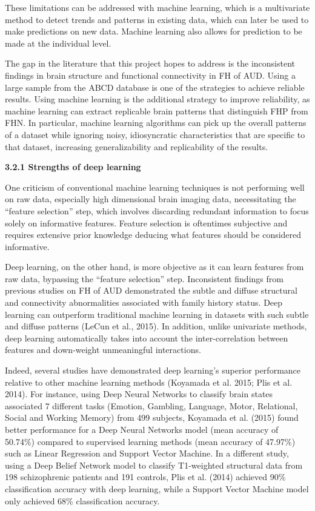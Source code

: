 \documentclass[]{article}
\begin{document}
These limitations can be addressed with machine learning, which is a
multivariate method to detect trends and patterns in existing data,
which can later be used to make predictions on new data. Machine
learning also allows for prediction to be made at the individual level.

The gap in the literature that this project hopes to address is the
inconsistent findings in brain structure and functional connectivity in
FH of AUD. Using a large sample from the ABCD database is one of the
strategies to achieve reliable results. Using machine learning is the
additional strategy to improve reliability, as machine learning can
extract replicable brain patterns that distinguish FHP from FHN. In
particular, machine learning algorithms can pick up the overall patterns
of a dataset while ignoring noisy, idiosyncratic characteristics that
are specific to that dataset, increasing generalizability and
replicability of the results.

\textbf{3.2.1 Strengths of deep learning}

One criticism of conventional machine learning techniques is not
performing well on raw data, especially high dimensional brain imaging
data, necessitating the ``feature selection'' step, which involves
discarding redundant information to focus solely on informative
features. Feature selection is oftentimes subjective and requires
extensive prior knowledge deducing what features should be considered
informative.

Deep learning, on the other hand, is more objective as it can learn
features from raw data, bypassing the ``feature selection'' step.
Inconsistent findings from previous studies on FH of AUD demonstrated
the subtle and diffuse structural and connectivity abnormalities
associated with family history status. Deep learning can outperform
traditional machine learning in datasets with such subtle and diffuse
patterns (LeCun et al., 2015). In addition, unlike univariate methods,
deep learning automatically takes into account the inter-correlation
between features and down-weight unmeaningful interactions.

Indeed, several studies have demonstrated deep learning's superior
performance relative to other machine learning methods (Koyamada et al.
2015; Plis et al. 2014). For instance, using Deep Neural Networks to
classify brain states associated 7 different tasks (Emotion, Gambling,
Language, Motor, Relational, Social and Working Memory) from 499
subjects, Koyamada et al. (2015) found better performance for a Deep
Neural Networks model (mean accuracy of 50.74\%) compared to supervised
learning methods (mean accuracy of 47.97\%) such as Linear Regression
and Support Vector Machine. In a different study, using a Deep Belief
Network model to classify T1-weighted structural data from 198
schizophrenic patients and 191 controls, Plis et al. (2014) achieved
90\% classification accuracy with deep learning, while a Support Vector
Machine model only achieved 68\% classification accuracy.
\end{document}
